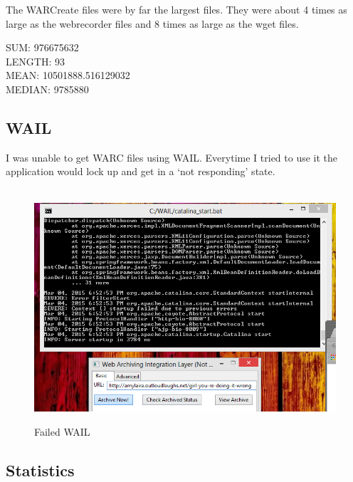 \documentclass[12pt]{article}
\begin{document}
The WARCreate files were by far the largest files.  They were about 4 times as large as the webrecorder files and 8 times as large as the wget files.

\begin{center}
\noindent SUM:  976675632\\
LENGTH:  93\\
MEAN:  10501888.516129032\\
MEDIAN:  9785880
\end{center}

\subsection{WAIL}

I was unable to get WARC files using WAIL.  Everytime I tried to use it the application would lock up and get in a `not responding' state.

\begin{figure}[H]
    \caption{Failed WAIL}
    \centering
    \includegraphics{failwail.PNG}
\end{figure}

\subsection{Statistics}
\end{document}
